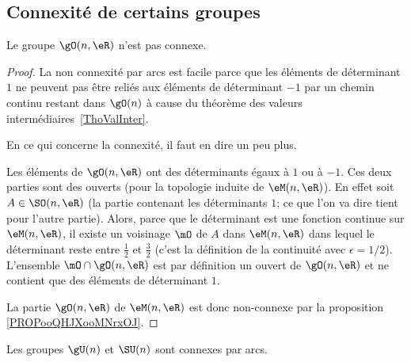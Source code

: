 \subsection{Connexité  de certains groupes}

\begin{lemma}           \label{LEMooIPOVooZJyNoH}
	Le groupe \( \gO(n,\eR)\) n'est pas connexe.
\end{lemma}

\begin{proof}
	La non connexité par arcs est facile parce que les éléments de déterminant \( 1\) ne peuvent pas être reliés aux éléments de déterminant \( -1\) par un chemin continu restant dans \( \gO(n)\) à cause du théorème des valeurs intermédiaires~\ref{ThoValInter}.

	En ce qui concerne la connexité, il faut en dire un peu plus.

	Les éléments de \( \gO(n,\eR)\) ont des déterminants égaux à \( 1\) ou à \( -1\). Ces deux parties sont des ouverts (pour la topologie induite de \( \eM(n,\eR)\)). En effet soit \( A\in\SO(n,\eR)\) (la partie contenant les déterminants \( 1\); ce que l'on va dire tient pour l'autre partie). Alors, parce que le déterminant est une fonction continue sur \( \eM(n,\eR)\), il existe un voisinage \( \mO\) de \( A\) dans \( \eM(n,\eR)\) dans lequel le déterminant reste entre \( \frac{ 1 }{2}\) et \( \frac{ 3 }{2}\) (c'est la définition de la continuité avec \( \epsilon=1/2\)). L'ensemble \( \mO\cap\gO(n,\eR)\) est par définition un ouvert de \( \gO(n,\eR)\) et ne contient que des éléments de déterminant \( 1\).

	La partie \( \gO(n,\eR)\) de \( \eM(n,\eR)\) est donc non-connexe par la proposition \ref{PROPooQHJXooMNrxOJ}.
\end{proof}

\begin{lemma}       \label{LEMooQMXHooZQozMK}
	Les groupes \( \gU(n)\) et \( \SU(n)\) sont connexes par arcs.
\end{lemma}

